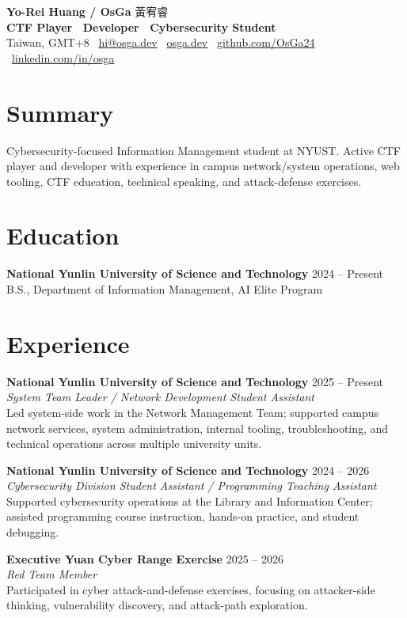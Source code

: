 \documentclass[10pt,a4paper]{article}
\newcommand{\entry}[4]{
  \textbf{#1} \hfill {\small #2}\\
  {\small \textit{#3}}\\[-3pt]
  {\small #4}\vspace{-2pt}
}
\newcommand{\compactentry}[3]{
  \textbf{#1} \hfill {\small #2}\\[-3pt]
  {\small #3}\vspace{-2pt}
}
\begin{document}
{\Large \textbf{Yo-Rei Huang / OsGa} \hfill \normalsize 黃宥睿}\\[-1pt]
\textbf{CTF Player \textbar\ Developer \textbar\ Cybersecurity Student}\\[-1pt]
Taiwan, GMT+8 \textbar\
\href{mailto:hi@osga.dev}{hi@osga.dev} \textbar\
\href{https://osga.dev}{osga.dev} \textbar\
\href{https://github.com/OsGa24}{github.com/OsGa24} \textbar\
\href{https://www.linkedin.com/in/osga}{linkedin.com/in/osga}

\section*{Summary}
Cybersecurity-focused Information Management student at NYUST. Active CTF player and developer with experience in campus network/system operations, web tooling, CTF education, technical speaking, and attack-defense exercises.

\section*{Education}
\compactentry
{National Yunlin University of Science and Technology}
{2024 -- Present}
{B.S., Department of Information Management, AI Elite Program}

\section*{Experience}
\entry
{National Yunlin University of Science and Technology}
{2025 -- Present}
{System Team Leader / Network Development Student Assistant}
{Led system-side work in the Network Management Team; supported campus network services, system administration, internal tooling, troubleshooting, and technical operations across multiple university units.}

\entry
{National Yunlin University of Science and Technology}
{2024 -- 2026}
{Cybersecurity Division Student Assistant / Programming Teaching Assistant}
{Supported cybersecurity operations at the Library and Information Center; assisted programming course instruction, hands-on practice, and student debugging.}

\entry
{Executive Yuan Cyber Range Exercise}
{2025 -- 2026}
{Red Team Member}
{Participated in cyber attack-and-defense exercises, focusing on attacker-side thinking, vulnerability discovery, and attack-path exploration.}
\end{document}
